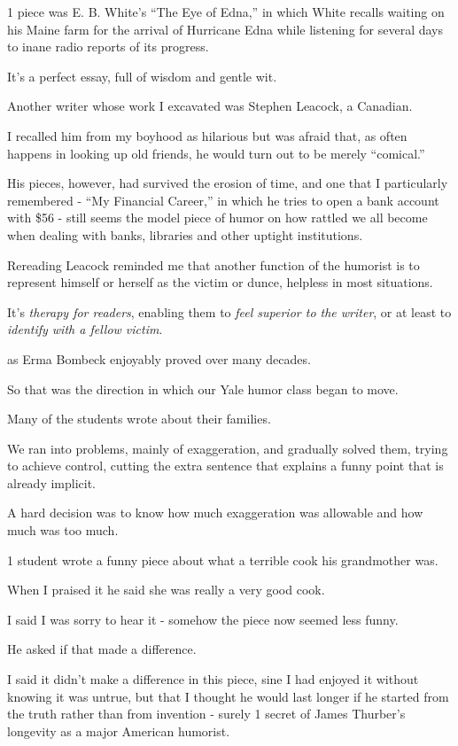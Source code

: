 \documentclass{book}
\numberwithin{equation}{section}
\begin{document}
1 piece was E. B. White's ``The Eye of Edna,'' in which White recalls waiting on his Maine farm for the arrival of Hurricane Edna while listening for several days to inane radio reports of its progress.

It's a perfect essay, full of wisdom and gentle wit.

%
Another writer whose work I excavated was Stephen Leacock, a Canadian.

I recalled him from my boyhood as hilarious but was afraid that, as often happens in looking up old friends, he would turn out to be merely ``comical.''

His pieces, however, had survived the erosion of time, and one that I particularly remembered - ``My Financial Career,'' in which he tries to open a bank account with \$56 - still seems the model piece of humor on how rattled we all become when dealing with banks, libraries and other uptight institutions.

Rereading Leacock reminded me that another function of the humorist is to represent himself or herself as the victim or dunce, helpless in most situations.

It's \textit{therapy for readers}, enabling them to \textit{feel superior to the writer}, or at least to \textit{identify with a fellow victim}.

 as Erma Bombeck enjoyably proved over many decades.

%
So that was the direction in which our Yale humor class began to move.

Many of the students wrote about their families.

We ran into problems, mainly of exaggeration, and gradually solved them, trying to achieve control, cutting the extra sentence that explains a funny point that is already implicit.

A hard decision was to know how much exaggeration was allowable and how much was too much.

1 student wrote a funny piece about what a terrible cook his grandmother was.

When I praised it he said she was really a very good cook.

I said I was sorry to hear it - somehow the piece now seemed less funny.

He asked if that made a difference.

I said it didn't make a difference in this piece, sine I had enjoyed it without knowing it was untrue, but that I thought he would last longer if he started from the truth rather than from invention - surely 1 secret of James Thurber's longevity as a major American humorist.
\end{document}
